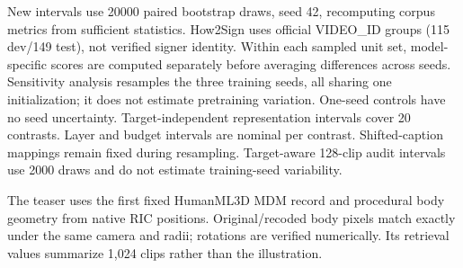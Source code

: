 \documentclass[10pt,twocolumn,letterpaper]{article}
\begin{document}
New intervals use 20000 paired bootstrap draws, seed 42, recomputing corpus metrics from sufficient statistics. How2Sign uses official VIDEO\_ID groups (115 dev/149 test), not verified signer identity. Within each sampled unit set, model-specific scores are computed separately before averaging differences across seeds. Sensitivity analysis resamples the three training seeds, all sharing one initialization; it does not estimate pretraining variation. One-seed controls have no seed uncertainty. Target-independent representation intervals cover 20 contrasts. Layer and budget intervals are nominal per contrast. Shifted-caption mappings remain fixed during resampling. Target-aware 128-clip audit intervals use 2000 draws and do not estimate training-seed variability.

The teaser uses the first fixed HumanML3D MDM record and procedural body geometry from native RIC positions. Original/recoded body pixels match exactly under the same camera and radii; rotations are verified numerically. Its retrieval values summarize 1,024 clips rather than the illustration.



\clearpage
{\small}
\end{document}
